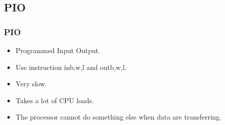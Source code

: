 \subsection{PIO}

\begin{frame}
        \frametitle{PIO}
        \begin{itemize}
        \item Programmed Input Output.
        \item Use instruction in{b,w,l} and out{b,w,l}.
        \item Very slow.
        \item Takes a lot of CPU loads.
        \item The processor cannot do something else when data are transferring.
        \end{itemize}
\end{frame}

